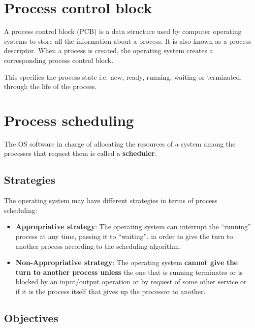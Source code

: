 \section{Process control block}

A process control block (PCB) is a data structure used by computer operating systems to store all the information about a process. It is also known as a process descriptor. When a process is created, the operating system creates a corresponding process control block.

This specifies the process state i.e. new, ready, running, waiting or terminated, through the life of the process.



\section{Process scheduling}

The OS software in charge of allocating the resources of a system among the processes that request them is called a \textbf{scheduler}.


\subsection{Strategies}
The operating system may have different strategies in terms of process scheduling:

\begin{itemize}
    \item \textbf{Appropriative strategy}: The operating system can interrupt the “running” process at any time, passing it to “waiting”, in order to give the turn to another process according to the scheduling algorithm.

    \item \textbf{Non-Appropriative strategy}: The operating system \textbf{cannot give the turn to another process unless} the one that is running terminates or is blocked by an input/output operation or by request of some other service or if it is the process itself that gives up the processor to another.
\end{itemize}

\subsection{Objectives}


